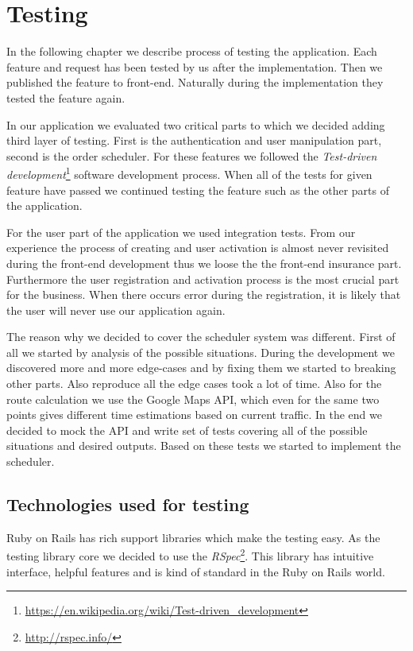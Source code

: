 \chapter{Testing}
In the following chapter we describe process of testing the application. Each feature and request has been tested by us after the implementation. Then we published the feature to front-end. Naturally during the implementation they tested the feature again.

 In our application we evaluated two critical parts to which we decided adding third layer of testing. First is the authentication and user manipulation part, second is the order scheduler. For these features we followed the \textit{Test-driven development}\footnote{\url{https://en.wikipedia.org/wiki/Test-driven_development}} software development process. When all of the tests for given feature have passed we continued testing the feature such as the other parts of the application.

 For the user part of the application we used integration tests. From our experience the process of creating and user activation is almost never revisited during the front-end development thus we loose the the front-end insurance part. Furthermore the user registration and activation process is the most crucial part for the business. When there occurs error during the registration, it is likely that the user will never use our application again.  
  
 The reason why we decided to cover the scheduler system was different. First of all we started by analysis of the possible situations. During the development we discovered more and more edge-cases and by fixing them we started to breaking other parts. Also reproduce all the edge cases took a lot of time. Also for the route calculation we use the Google Maps API, which even for the same two points gives different time estimations based on current traffic. In the end we decided to mock the API and write set of tests covering all of the possible situations and desired outputs. Based on these tests we started to implement the scheduler. 
 

\section{Technologies used for testing}

Ruby on Rails has rich support libraries which make the testing easy. As the testing library core we decided to use the \textit{RSpec}\footnote{\url{http://rspec.info/}}. This library has intuitive interface, helpful features and is kind of standard in the Ruby on Rails world.

